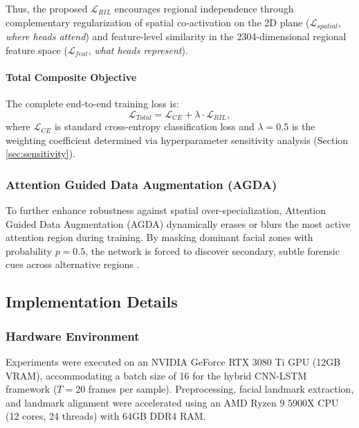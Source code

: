 Thus, the proposed $\mathcal{L}_{RIL}$ encourages regional independence through complementary regularization of spatial co-activation on the 2D plane ($\mathcal{L}_{spatial}$, \textit{where heads attend}) and feature-level similarity in the 2304-dimensional regional feature space ($\mathcal{L}_{feat}$, \textit{what heads represent}).

\paragraph{Total Composite Objective}
The complete end-to-end training loss is:
\begin{equation}
    \mathcal{L}_{Total} = \mathcal{L}_{CE} + \lambda \cdot \mathcal{L}_{RIL},
\end{equation}
where $\mathcal{L}_{CE}$ is standard cross-entropy classification loss and $\lambda = 0.5$ is the weighting coefficient determined via hyperparameter sensitivity analysis (Section \ref{sec:sensitivity}).

\subsubsection{Attention Guided Data Augmentation (AGDA)}
To further enhance robustness against spatial over-specialization, Attention Guided Data Augmentation (AGDA) dynamically erases or blurs the most active attention region during training. By masking dominant facial zones with probability $p=0.5$, the network is forced to discover secondary, subtle forensic cues across alternative regions \citep{Zhao2021MultiAttentional}.

\subsection{Implementation Details}

\subsubsection{Hardware Environment}
Experiments were executed on an NVIDIA GeForce RTX 3080 Ti GPU (12GB VRAM), accommodating a batch size of 16 for the hybrid CNN-LSTM framework ($T=20$ frames per sample). Preprocessing, facial landmark extraction, and landmark alignment were accelerated using an AMD Ryzen 9 5900X CPU (12 cores, 24 threads) with 64GB DDR4 RAM.

